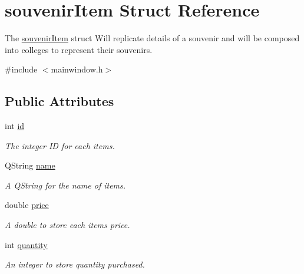 \hypertarget{structsouvenir_item}{}\section{souvenir\+Item Struct Reference}
\label{structsouvenir_item}


The \mbox{\hyperlink{structsouvenir_item}{souvenir\+Item}} struct Will replicate details of a souvenir and will be composed into colleges to represent their souvenirs.  




{\ttfamily \#include $<$mainwindow.\+h$>$}

\subsection*{Public Attributes}
\begin{DoxyCompactItemize}
\item 
\mbox{\label{structsouvenir_item_af15cfc3c9a9ad28a32c95c9eb9632e13}} 
int \mbox{\hyperlink{structsouvenir_item_af15cfc3c9a9ad28a32c95c9eb9632e13}{id}}
\begin{DoxyCompactList}\small\item\em The integer ID for each items. \end{DoxyCompactList}\item 
\mbox{\label{structsouvenir_item_a39ed37d1f5d53285c8a7628c81946a13}} 
Q\+String \mbox{\hyperlink{structsouvenir_item_a39ed37d1f5d53285c8a7628c81946a13}{name}}
\begin{DoxyCompactList}\small\item\em A Q\+String for the name of items. \end{DoxyCompactList}\item 
\mbox{\label{structsouvenir_item_ab01bd33d7c6f6e716303eaf45cbc78fd}} 
double \mbox{\hyperlink{structsouvenir_item_ab01bd33d7c6f6e716303eaf45cbc78fd}{price}}
\begin{DoxyCompactList}\small\item\em A double to store each item\textquotesingle{}s price. \end{DoxyCompactList}\item 
\mbox{\label{structsouvenir_item_a8a0c48f4b9b511e45e80fc21785469e9}} 
int \mbox{\hyperlink{structsouvenir_item_a8a0c48f4b9b511e45e80fc21785469e9}{quantity}}
\begin{DoxyCompactList}\small\item\em An integer to store quantity purchased. \end{DoxyCompactList}\end{DoxyCompactItemize}



